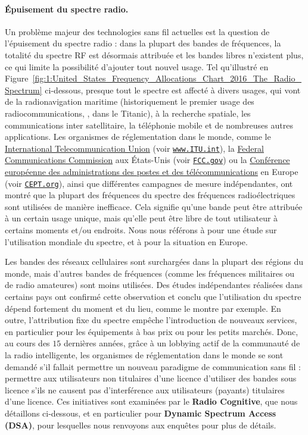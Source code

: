 \begin{resume_fr}
\paragraph{Épuisement du spectre radio.}
%
Un problème majeur des technologies sans fil actuelles est la question de l'épuisement du spectre radio :
dans la plupart des bandes de fréquences, la totalité du spectre RF est désormais attribuée et les bandes libres n'existent plus, ce qui limite la possibilité d'ajouter tout nouvel usage.
Tel qu'illustré en Figure~\ref{fig:1:United_States_Frequency_Allocations_Chart_2016_The_Radio_Spectrum} ci-dessous,
presque tout le spectre
est affecté à divers usages, qui vont de la radionavigation maritime (historiquement le premier usage des radiocommunications, \eg, dans le Titanic), à la recherche spatiale, les communications inter satellitaire, la téléphonie mobile et de nombreuses autres applications.
%
Les organismes de réglementation dans le monde, comme le
\href{https://www.itu.int/en/Pages/default.aspx}{International Telecommunication Union} (voir \href{https://www.itu.int/}{\texttt{www.ITU.int}}),
la \href{https://www.fcc.gov/}{Federal Communications Commission} aux États-Unis (voir \href{https://www.fcc.gov/}{\texttt{FCC.gov}})
ou la \href{https://cept.org}{ Conférence européenne des administrations des postes et des télécommunications} en Europe (voir \href{https://www.CEPT.org/}{\texttt{CEPT.org}}),
ainsi que différentes campagnes de mesure indépendantes, ont montré que la plupart des fréquences du spectre des fréquences radioélectriques sont utilisées de manière inefficace.
Cela signifie qu'une bande peut être attribuée à un certain usage unique, mais qu'elle peut être libre de tout utilisateur à certains moments et/ou endroits.
Nous nous référons à \cite{patil2011survey} pour une étude sur l'utilisation mondiale du spectre, et à \cite{valenta2010survey} pour la situation en Europe.


Les bandes des réseaux cellulaires sont surchargées dans la plupart des régions du monde, mais d'autres bandes de fréquences (comme les fréquences militaires ou de radio amateures) sont moins utilisées.
Des études indépendantes réalisées dans certains pays ont confirmé cette observation et conclu que l'utilisation du spectre dépend fortement du moment et du lieu, comme le montre \cite{Lopez2009spectral} par exemple.
En outre, l'attribution fixe du spectre empêche
l'introduction de nouveaux services, en particulier pour les équipements à bas prix ou pour les petits marchés.
%
Donc, au cours des $15$ dernières années, grâce à un lobbying actif de la communauté de la radio intelligente,
les organismes de réglementation dans le monde se sont demandé s'il fallait permettre un nouveau paradigme de communication sans fil :
permettre aux utilisateurs non titulaires d'une licence d'utiliser des bandes sous licence s'ils ne causent pas d'interférence aux utilisateurs (payants) titulaires d'une licence.
Ces initiatives sont examinées par le \textbf{Radio Cognitive},
que nous détaillons ci-dessous, et en particulier pour \textbf{Dynamic Spectrum Access (DSA)},
pour lesquelles nous renvoyons aux enquêtes \cite{akyildiz2006next,garhwal2012survey} pour plus de détails.




\end{resume_fr}
